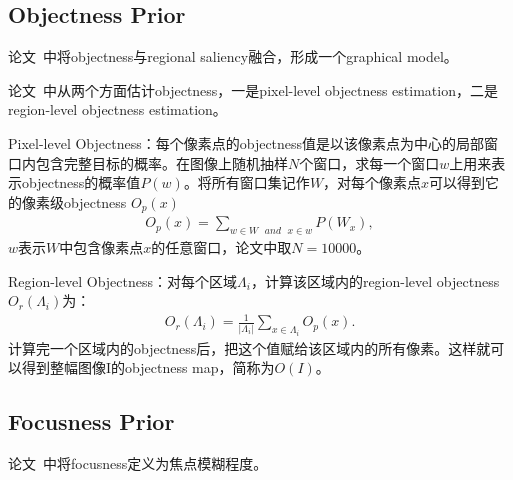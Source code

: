 \documentclass[12pt]{article}
\begin{document}
\subsection{Objectness Prior}

论文~\cite{chang2011fusing}中将objectness与regional saliency融合，形成一个graphical model。

论文~\cite{jiangpeng2013salient}中从两个方面估计objectness，一是pixel-level objectness estimation，二是region-level objectness estimation。

Pixel-level Objectness：每个像素点的objectness值是以该像素点为中心的局部窗口内包含完整目标的概率。在图像上随机抽样$N$个窗口，求每一个窗口$w$上用来表示objectness的概率值$P(w)$。将所有窗口集记作$W$，对每个像素点$x$可以得到它的像素级objectness $O_p(x)$
\begin{align}
O_p(x) = \sum_{w \in W \text{ }and \text{ } x \in w} P(W_x),
\end{align}
$w$表示$W$中包含像素点$x$的任意窗口，论文中取$N=10000$。

Region-level Objectness：对每个区域$\Lambda_i$，计算该区域内的region-level objectness $O_r(\Lambda_i)$为：
\begin{align}
O_r(\Lambda_i) = \frac{1}{|\Lambda_i|}\sum_{x \in \Lambda_i} O_p(x).
\end{align}
计算完一个区域内的objectness后，把这个值赋给该区域内的所有像素。这样就可以得到整幅图像I的objectness map，简称为$O(I)$。

\subsection{Focusness Prior}

论文~\cite{jiangpeng2013salient}中将focusness定义为焦点模糊程度。




%


\end{document}

